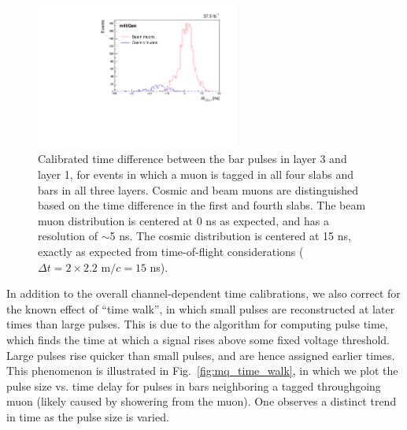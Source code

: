 {\begin{figure}[t]
  \begin{center}
    \includegraphics[width=0.60\textwidth]{figs/milliq/time_calib.pdf}
    \caption{Calibrated time difference between the bar pulses in layer 3 and layer 1,
      for events in which a muon is tagged in all four slabs and bars in all
      three layers. Cosmic and beam muons are distinguished based on the time difference
      in the first and fourth slabs. The beam muon distribution is centered at 0 ns as expected,
      and has a resolution of $\sim$5 ns. The cosmic distribution is centered at 15 ns,
      exactly as expected from time-of-flight considerations ($\Delta t=2\times 2.2\text{ m}/c = 15$ ns).
            }
    \label{fig:mq_time_calib}
  \end{center}
\end{figure}

In addition to the overall channel-dependent time calibrations, we also correct for the known effect
of ``time walk'', in which small pulses are reconstructed at later times than large pulses. This is
due to the algorithm for computing pulse time, which finds the time at which a signal rises above
some fixed voltage threshold. Large pulses rise quicker than small pulses, and are hence assigned earlier
times. This phenomenon is illustrated in Fig.~\ref{fig:mq_time_walk}, in which we plot the pulse
size vs. time delay for pulses in bars neighboring a tagged throughgoing muon (likely caused by
showering from the muon). One observes a distinct trend in time as the pulse size is varied.

}
